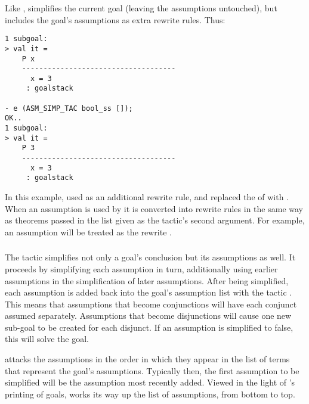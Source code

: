 Like ,  simplifies the current goal
(leaving the assumptions untouched), but includes the goal's
assumptions as extra rewrite rules.  Thus:
\begin{session}
\begin{verbatim}
1 subgoal:
> val it =
    P x
    ------------------------------------
      x = 3
     : goalstack

- e (ASM_SIMP_TAC bool_ss []);
OK..
1 subgoal:
> val it =
    P 3
    ------------------------------------
      x = 3
     : goalstack
\end{verbatim}
\end{session}
\noindent
In this example,  used  as an
additional rewrite rule, and replaced the  of 
with .  When an assumption is used by  it
is converted into rewrite rules in the same way as theorems passed in
the list given as the tactic's second argument.  For example, an
assumption  will be treated as the rewrite .

\subsubsection{}

\noindent
The tactic  simplifies not only a goal's
conclusion but its assumptions as well.  It proceeds by simplifying
each assumption in turn, additionally using earlier assumptions in the
simplification of later assumptions.  After being simplified, each
assumption is added back into the goal's assumption list with the
tactic .  This means that assumptions that
become conjunctions will have each conjunct assumed separately.
Assumptions that become disjunctions will cause one new sub-goal to be
created for each disjunct.  If an assumption is simplified to false,
this will solve the goal.

 attacks the assumptions in the order in which
they appear in the list of terms that represent the goal's
assumptions.  Typically then, the first assumption to be simplified
will be the assumption most recently added.  Viewed in the light of
's printing of goals,  works its
way up the list of assumptions, from bottom to top.

